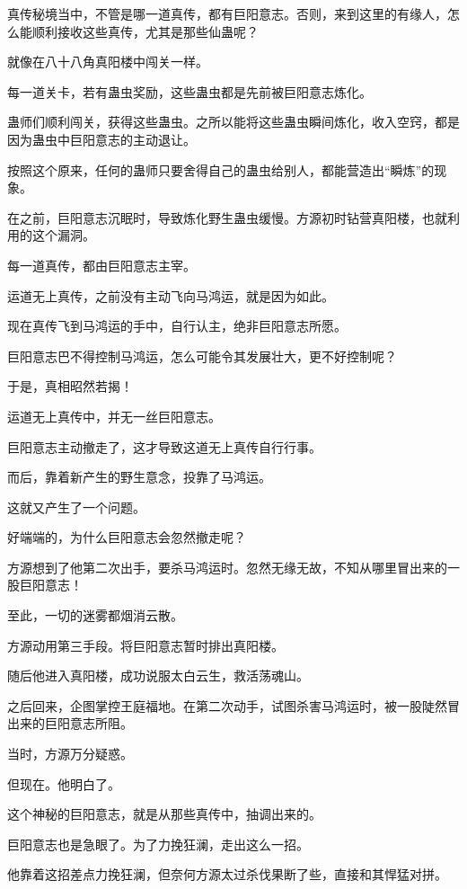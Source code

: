 
\begin{this_body}

真传秘境当中，不管是哪一道真传，都有巨阳意志。否则，来到这里的有缘人，怎么能顺利接收这些真传，尤其是那些仙蛊呢？

就像在八十八角真阳楼中闯关一样。

每一道关卡，若有蛊虫奖励，这些蛊虫都是先前被巨阳意志炼化。

蛊师们顺利闯关，获得这些蛊虫。之所以能将这些蛊虫瞬间炼化，收入空窍，都是因为蛊虫中巨阳意志的主动退让。

按照这个原来，任何的蛊师只要舍得自己的蛊虫给别人，都能营造出“瞬炼”的现象。

在之前，巨阳意志沉眠时，导致炼化野生蛊虫缓慢。方源初时钻营真阳楼，也就利用的这个漏洞。

每一道真传，都由巨阳意志主宰。

运道无上真传，之前没有主动飞向马鸿运，就是因为如此。

现在真传飞到马鸿运的手中，自行认主，绝非巨阳意志所愿。

巨阳意志巴不得控制马鸿运，怎么可能令其发展壮大，更不好控制呢？

于是，真相昭然若揭！

运道无上真传中，并无一丝巨阳意志。

巨阳意志主动撤走了，这才导致这道无上真传自行行事。

而后，靠着新产生的野生意念，投靠了马鸿运。

这就又产生了一个问题。

好端端的，为什么巨阳意志会忽然撤走呢？

方源想到了他第二次出手，要杀马鸿运时。忽然无缘无故，不知从哪里冒出来的一股巨阳意志！

至此，一切的迷雾都烟消云散。

方源动用第三手段。将巨阳意志暂时排出真阳楼。

随后他进入真阳楼，成功说服太白云生，救活荡魂山。

之后回来，企图掌控王庭福地。在第二次动手，试图杀害马鸿运时，被一股陡然冒出来的巨阳意志所阻。

当时，方源万分疑惑。

但现在。他明白了。

这个神秘的巨阳意志，就是从那些真传中，抽调出来的。

巨阳意志也是急眼了。为了力挽狂澜，走出这么一招。

他靠着这招差点力挽狂澜，但奈何方源太过杀伐果断了些，直接和其悍猛对拼。


\end{this_body}
